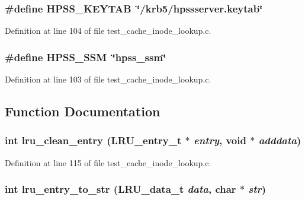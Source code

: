 \subsubsection[{HPSS\_\-KEYTAB}]{\setlength{\rightskip}{0pt plus 5cm}\#define HPSS\_\-KEYTAB~\char`\"{}/krb5/hpssserver.keytab\char`\"{}}\label{test__cache__inode__lookup_8c_547201ff2674f71edbe3ba4ec6296d93}




Definition at line 104 of file test\_\-cache\_\-inode\_\-lookup.c.
\subsubsection[{HPSS\_\-SSM}]{\setlength{\rightskip}{0pt plus 5cm}\#define HPSS\_\-SSM~\char`\"{}hpss\_\-ssm\char`\"{}}\label{test__cache__inode__lookup_8c_863b7cbf4c49b9bdda01992b993130a2}




Definition at line 103 of file test\_\-cache\_\-inode\_\-lookup.c.

\subsection{Function Documentation}
\subsubsection[{lru\_\-clean\_\-entry}]{\setlength{\rightskip}{0pt plus 5cm}int lru\_\-clean\_\-entry (LRU\_\-entry\_\-t $\ast$ {\em entry}, \/  void $\ast$ {\em adddata})}\label{test__cache__inode__lookup_8c_27ecbab481a3103e078489a212a52e3f}




Definition at line 115 of file test\_\-cache\_\-inode\_\-lookup.c.
\subsubsection[{lru\_\-entry\_\-to\_\-str}]{\setlength{\rightskip}{0pt plus 5cm}int lru\_\-entry\_\-to\_\-str (LRU\_\-data\_\-t {\em data}, \/  char $\ast$ {\em str})}\label{test__cache__inode__lookup_8c_d3e6e5506644e1986e6475939863ad3e}




